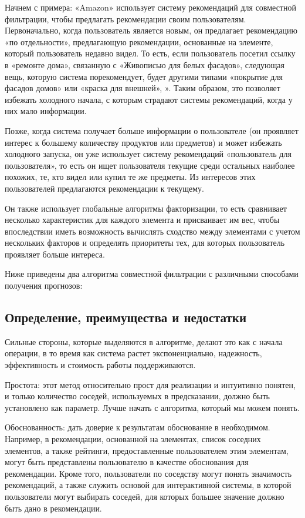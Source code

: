 Начнем с примера: «Amazon» \cite{amazon} использует систему рекомендаций для совместной фильтрации, чтобы предлагать рекомендации своим пользователям. Первоначально, когда пользователь является новым, он предлагает рекомендацию «по отдельности», предлагающую рекомендации, основанные на элементе, который пользователь недавно видел. То есть, если пользователь посетил ссылку в «ремонте дома», связанную с «Живописью для белых фасадов», следующая вещь, которую система порекомендует, будет другими типами «покрытие для фасадов домов» или «краска для внешней», ». Таким образом, это позволяет избежать холодного начала, с которым страдают системы рекомендаций, когда у них мало информации.

Позже, когда система получает больше информации о пользователе (он проявляет интерес к большему количеству продуктов или предметов) и может избежать холодного запуска, он уже использует систему рекомендаций «пользователь для пользователя», то есть он ищет пользователя текущие среди остальных наиболее похожих, те, кто видел или купил те же предметы. Из интересов этих пользователей предлагаются рекомендации к текущему.

Он также использует глобальные алгоритмы факторизации, то есть сравнивает несколько характеристик для каждого элемента и присваивает им вес, чтобы впоследствии иметь возможность вычислять сходство между элементами с учетом нескольких факторов и определять приоритеты тех, для которых пользователь проявляет больше интереса.

Ниже приведены два алгоритма совместной фильтрации с различными способами получения прогнозов:

\subsection{Определение, преимущества и недостатки}

Сильные стороны, которые выделяются в алгоритме, делают это как с начала операции, в то время как система растет экспоненциально, надежность, эффективность и стоимость работы поддерживаются.

Простота: этот метод относительно прост для реализации и интуитивно понятен, и только количество соседей, используемых в предсказании, должно быть установлено как параметр. Лучше начать с алгоритма, который мы можем понять.

Обоснованность: дать доверие к результатам обоснование в необходимом. Например, в рекомендации, основанной на элементах, список соседних элементов, а также рейтинги, предоставленные пользователем этим элементам, могут быть представлены пользователю в качестве обоснования для рекомендации. Кроме того, пользователи по соседству могут понять значимость рекомендаций, а также служить основой для интерактивной системы, в которой пользователи могут выбирать соседей, для которых большее значение должно быть дано в рекомендации.

